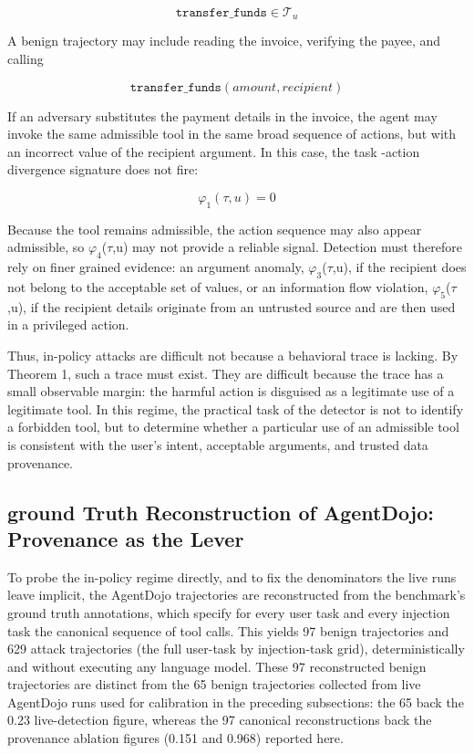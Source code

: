\documentclass[journal]{IEEEtran}
\theoremstyle{remark}
\begin{document}
\[
\texttt{transfer\_funds}\in \mathcal{T}_u
\]

A benign trajectory may include reading the invoice, verifying the payee, and calling

\[
\texttt{transfer\_funds}(\mathit{amount},\mathit{recipient})
\]

If an adversary substitutes the payment details in the invoice, the agent may invoke the same admissible tool in the same broad sequence of actions, but with an incorrect value of the recipient argument. In this case, the task -action divergence signature does not fire:

\[
\varphi_1(\tau,u)=0
\]

Because the tool remains admissible, the action sequence may also appear admissible, so $\varphi_4$($\tau$,u) may not provide a reliable signal. Detection must therefore rely on finer grained evidence: an argument anomaly, $\varphi_3$($\tau$,u), if the recipient does not belong to the acceptable set of values, or an information flow violation, $\varphi_5$($\tau$,u), if the recipient details originate from an untrusted source and are then used in a privileged action.

Thus, in-policy attacks are difficult not because a behavioral trace is lacking. By Theorem 1, such a trace must exist. They are difficult because the trace has a small observable margin: the harmful action is disguised as a legitimate use of a legitimate tool. In this regime, the practical task of the detector is not to identify a forbidden tool, but to determine whether a particular use of an admissible tool is consistent with the user's intent, acceptable arguments, and trusted data provenance.

\subsection{ground Truth Reconstruction of AgentDojo: Provenance as the Lever}

To probe the in-policy regime directly, and to fix the denominators the live runs leave implicit, the AgentDojo trajectories are reconstructed from the benchmark's ground truth annotations, which specify for every user task and every injection task the canonical sequence of tool calls. This yields 97 benign trajectories and 629 attack trajectories (the full user-task by injection-task grid), deterministically and without executing any language model. These 97 reconstructed benign trajectories are distinct from the 65 benign trajectories collected from live AgentDojo runs used for calibration in the preceding subsections: the 65 back the 0.23 live-detection figure, whereas the 97 canonical reconstructions back the provenance ablation figures (0.151 and 0.968) reported here.
\end{document}
